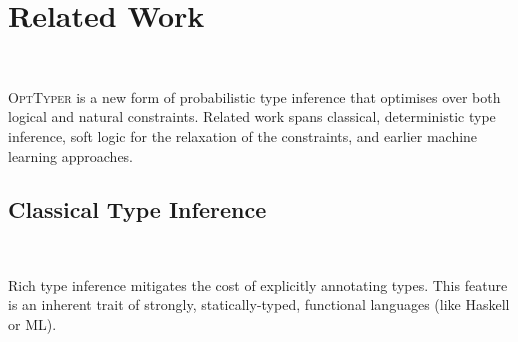 \documentclass[acmsmall, review, anonymous]{acmart}\settopmatter{printfolios=true,printccs=false,printacmref=false}
\newcommand{\projectname}{\textsc{OptTyper}\xspace}
\newcommand{\margincomment}[2]{\marginpar{\scriptsize\color{Maroon}#1 says: #2}}
\newcommand{\adg}[1]{\margincomment{ADG}{#1}}
\newcommand{\etb}[1]{\margincomment{Earl}{#1}}
\begin{document}


\section{Related Work}~\label{sec:related}

\projectname is a new form of probabilistic type inference that optimises over
both logical and natural constraints.  Related work spans classical, deterministic
type inference, soft logic for the relaxation of the constraints, and earlier machine learning approaches.

\subsection{Classical Type Inference}~\label{}


Rich type inference mitigates the cost
of explicitly annotating types. This feature is an
inherent trait of strongly, statically-typed, functional languages (like Haskell or ML).

\end{document}
